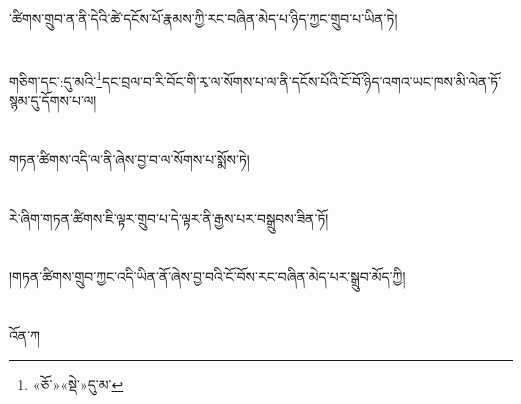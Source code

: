 ་ཚིགས་གྲུབ་ན་ནི་དེའི་ཚེ་དངོས་པོ་རྣམས་ཀྱི་རང་བཞིན་མེད་པ་ཉིད་ཀྱང་གྲུབ་པ་ཡིན་ཏེ།\chapter{ }གཅིག་དང་:དུ་མའི་\footnote{«ཅོ་»«སྡེ་»དུ་མ་}དང་བྲལ་བ་རི་བོང་གི་རྭ་ལ་སོགས་པ་ལ་ནི་དངོས་པོའི་ངོ་བོ་ཉིད་འགའ་ཡང་ཁས་མི་ལེན་ཏོ་སྙམ་དུ་དོགས་པ་ལ།\chapter{ }གཏན་ཚིགས་འདི་ལ་ནི་ཞེས་བྱ་བ་ལ་སོགས་པ་སྨོས་ཏེ།\chapter{ }རེ་ཞིག་གཏན་ཚིགས་ཇི་ལྟར་གྲུབ་པ་དེ་ལྟར་ནི་རྒྱས་པར་བསྒྲུབས་ཟིན་ཏོ།\chapter{ }།གཏན་ཚིགས་གྲུབ་ཀྱང་འདི་ཡིན་ནོ་ཞེས་བྱ་བའི་ངོ་བོས་རང་བཞིན་མེད་པར་སྒྲུབ་མོད་ཀྱི།\chapter{ }འོན་ཀ